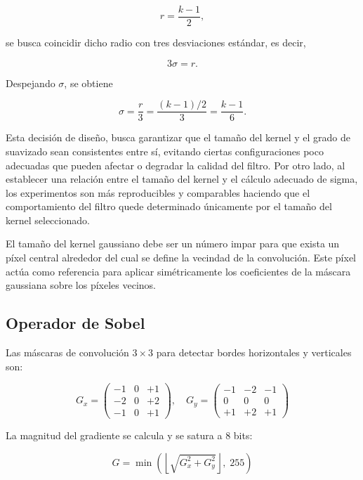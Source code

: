 \documentclass[12pt,a4paper]{article}
\begin{document}
\[
r = \frac{k-1}{2},
\]

se busca coincidir dicho radio con tres desviaciones estándar, es decir,

\[
3\sigma = r.
\]

Despejando \(\sigma\), se obtiene

\[
\sigma = \frac{r}{3}
       = \frac{(k-1)/2}{3}
       = \frac{k-1}{6}.
\]

Esta decisión de diseño, busca garantizar que el tamaño del kernel y el grado de suavizado sean consistentes entre sí, evitando ciertas configuraciones poco adecuadas que pueden afectar o degradar la calidad del filtro. Por otro lado, al establecer una relación entre el tamaño del kernel y el cálculo adecuado de sigma, los experimentos son más reproducibles y comparables haciendo que el comportamiento del filtro quede determinado únicamente por el tamaño del kernel seleccionado.

El tamaño del kernel gaussiano debe ser un número impar para que exista un píxel central alrededor del cual se define la vecindad de la convolución. Este píxel actúa como referencia para aplicar simétricamente los coeficientes de la máscara gaussiana sobre los píxeles vecinos.

\subsection{Operador de Sobel}

Las m\'ascaras de convoluci\'on $3 \times 3$ para detectar bordes horizontales y verticales son:

\begin{equation}
G_x = \begin{pmatrix}-1 & 0 & +1\\-2 & 0 & +2\\-1 & 0 & +1\end{pmatrix}, \quad
G_y = \begin{pmatrix}-1 & -2 & -1\\0 & 0 & 0\\+1 & +2 & +1\end{pmatrix}
\end{equation}

La magnitud del gradiente se calcula y se satura a 8 bits:

\begin{equation}
G = \min\!\left(\left\lfloor\sqrt{G_x^2 + G_y^2}\right\rfloor,\; 255\right)
\end{equation}
\end{document}

